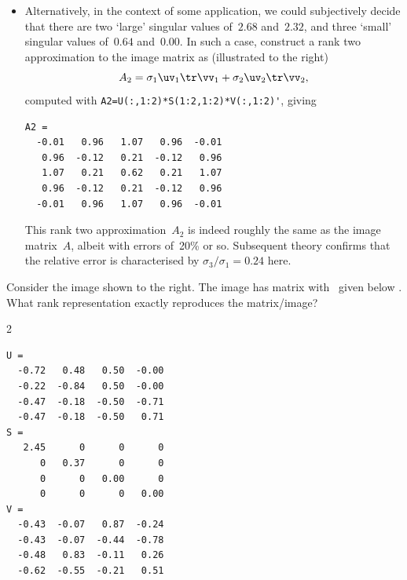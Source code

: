 \begin{example}
\begin{solution}
\begin{itemize}
\item 
\begin{figbox}{}%
Alternatively, in the context of some application, we could subjectively decide that there are two `large' singular values of~\(2.68\) and~\(2.32\), and three `small' singular values of~\(0.64\) and~\(0.00\).
In such a case, construct a rank two approximation to the image matrix as (illustrated to the right)
\begin{equation*}
A_2=\sigma_1\uv_1\tr\vv_1+\sigma_2\uv_2\tr\vv_2,
\end{equation*}
computed with \verb|A2=U(:,1:2)*S(1:2,1:2)*V(:,1:2)'|, giving \twodp
\end{figbox}

\begin{verbatim}
A2 =
  -0.01   0.96   1.07   0.96  -0.01
   0.96  -0.12   0.21  -0.12   0.96
   1.07   0.21   0.62   0.21   1.07
   0.96  -0.12   0.21  -0.12   0.96
  -0.01   0.96   1.07   0.96  -0.01
\end{verbatim}
This rank two approximation~\(A_2\) is indeed roughly the same as the image matrix~\(A\), albeit with errors of~20\% or so.
Subsequent theory confirms that the relative error is characterised by \(\sigma_3/\sigma_1=0.24\) here.
\aqed
\end{itemize}
\end{solution}
\end{example}



\begin{activity}[]
Consider the image shown to the right.
The image has matrix with \svd\ given below \twodp.
What rank representation exactly reproduces the matrix\slash image?

\begin{multicols}2
\begin{verbatim}
U =
  -0.72   0.48   0.50  -0.00
  -0.22  -0.84   0.50  -0.00
  -0.47  -0.18  -0.50  -0.71
  -0.47  -0.18  -0.50   0.71
S =
   2.45      0      0      0
      0   0.37      0      0
      0      0   0.00      0
      0      0      0   0.00
V =
  -0.43  -0.07   0.87  -0.24
  -0.43  -0.07  -0.44  -0.78
  -0.48   0.83  -0.11   0.26
  -0.62  -0.55  -0.21   0.51
\end{verbatim}
\end{multicols}
\end{activity}




